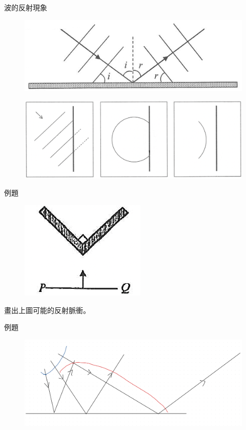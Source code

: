 \documentclass[13pt]{beamer}
\begin{document}
\begin{frame}{波的反射現象}
    \begin{figure}
        \centering
        \includegraphics[width=0.5\linewidth]{images/Screenshot_21.png}
    \end{figure}\bigskip
    \begin{figure}
        \centering
        \includegraphics[width=1\linewidth]{images/Screenshot 2023-09-26 at 11.02.18 PM.png}
    \end{figure}
\end{frame}

\begin{frame}[t]{例題}
    \begin{figure}
        \centering
        \includegraphics[width=0.25\linewidth]{images/Screenshot 2023-09-27 at 7.20.47 PM.png}


    \end{figure}
    畫出上圖可能的反射脈衝。
\end{frame}

\begin{frame}{例題}
    \begin{figure}
        \centering
        \includegraphics[width=1\linewidth]{images/IMG_F76D36A09E8B-1.jpeg}


    \end{figure}
\end{frame}
\end{document}
